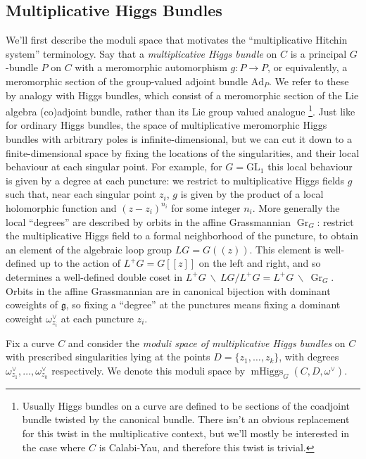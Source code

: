 \documentclass[11pt, oneside, reqno]{amsart}
\theoremstyle{definition} \newtheorem{definition}{Definition}[section]
\theoremstyle{definition} \newtheorem{remark}[definition]{Remark}
\theoremstyle{definition} \newtheorem{remarks}[definition]{Remarks}
\theoremstyle{definition} \newtheorem{question}[definition]{Question}
\theoremstyle{definition} \newtheorem*{note}{Note}
\theoremstyle{definition} \newtheorem{example}[definition]{Example}
\theoremstyle{definition} \newtheorem{examples}[definition]{Examples}
\renewcommand{\gg}{\mathfrak{g}}
\newcommand{\mr}[1]{\mathrm{#1}}
\newcommand{\bs}{\ \backslash \ }
\newcommand{\GL}{\mathrm{GL}}
\DeclareMathOperator{\Gr}{Gr}
\DeclareMathOperator{\mhiggs}{mHiggs}
\begin{document}
\subsection{Multiplicative Higgs Bundles}
We'll first describe the moduli space that motivates the
``multiplicative Hitchin system'' terminology.  Say that a
\emph{multiplicative Higgs bundle} on $C$ is a principal $G$-bundle
$P$ on $C$ with a meromorphic automorphism $g \colon P \to P$, or
equivalently, a meromorphic section of the group-valued adjoint bundle
$\mr{Ad}_P$.  We refer to these by analogy with Higgs bundles, which
consist of a meromorphic section of the Lie algebra (co)adjoint
bundle, rather than its Lie group valued analogue \footnote{Usually
  Higgs bundles on a curve are defined to be sections of the coadjoint
  bundle twisted by the canonical bundle.  There isn't an obvious
  replacement for this twist in the multiplicative context, but we'll
  mostly be interested in the case where $C$ is Calabi-Yau, and
  therefore this twist is trivial.}.  Just like for ordinary Higgs
bundles, the space of multiplicative meromorphic Higgs bundles with
arbitrary poles is infinite-dimensional, but we can cut it down to a
finite-dimensional space by fixing the locations of the singularities,
and their local behaviour at each singular point.  For example, for $G = \GL_1$ this local behaviour is given by a degree at each puncture: we restrict to multiplicative Higgs fields $g$ such that, near each singular point $z_i$, $g$ is given by the product of a local holomorphic function and $(z-z_i)^{n_i}$ for some integer $n_i$.  More generally the local ``degrees'' are described by orbits in the
affine Grassmannian $\Gr_G$: restrict the multiplicative Higgs field
to a formal neighborhood of the puncture, to obtain an element of the
algebraic loop group $LG = G(\!(z)\!)$.  This element is well-defined
up to the action of $L^+G = G[[z]]$ on the left and right, and so
determines a well-defined double coset in
$L^+G \!\!\bs\!\! LG/L^+G = L^+G \!\!\bs\!\! \Gr_G$.  Orbits in the
affine Grassmannian are in canonical bijection with dominant coweights
of $\gg$, so fixing a ``degree'' at the punctures means fixing a dominant
coweight $\omega^\vee_{z_i}$ at each puncture $z_i$.
 
 Fix a curve $C$ and consider the \emph{moduli space of multiplicative Higgs bundles} on $C$ with prescribed singularities lying at the points $D = \{z_1, \ldots, z_k\}$, with degrees $\omega_{z_1}^\vee, \ldots, \omega_{z_k}^\vee$ respectively.  We denote this moduli space by $\mhiggs_G(C,D,\omega^\vee)$.
 
\end{document}

